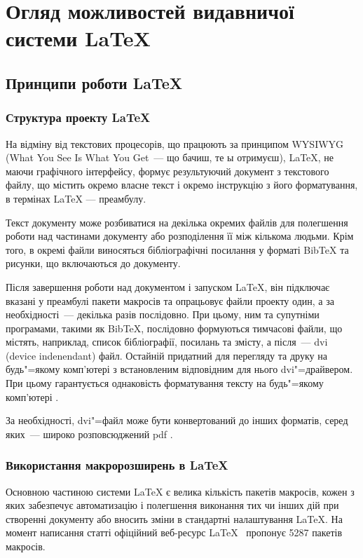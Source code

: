 \chapter{Огляд можливостей видавничої системи \LaTeX{} } 
\label{chapter:first}

\section{Принципи роботи \LaTeX{}}

\subsection{Структура проекту \LaTeX{}}

На відміну від текстових процесорів, що працюють за принципом {WYSIWYG} (What You See Is What You Get~--- що бачиш, те ы отримуєш), \LaTeX{}, не маючи графічного інтерфейсу, формує результуючий документ з текстового файлу, що містить окремо власне текст і окремо інструкцію з його форматування, в термінах \LaTeX{} --- преамбулу.

Текст документу може розбиватися на декілька окремих файлів для полегшення роботи над частинами документу або розподілення її між кількома людьми. Крім того, в окремі файли виносяться бібліографічні посилання у форматі BibTeX та рисунки, що включаються до документу. 

Після завершення роботи над документом і запуском \LaTeX{}, він підключає вказані у преамбулі пакети макросів та опрацьовує файли проекту один, а за необхідності~--- декілька разів послідовно. При цьому, ним та супутніми програмами, такими як BibTeX, послідовно формуються тимчасові файли, що містять, наприклад, список бібліографії, посилань та змісту, а після~--- dvi (device indenendant) файл. Остайній придатний для перегляду та друку на будь"=якому комп'ютері з встановленим відповідним для нього dvi"=драйвером. При цьому гарантується однаковість форматування тексту на будь"=якому комп'ютері \cite[с.~16]{Lvovskii2010NaborVerstka}.

За необхідності, dvi"=файл може бути конвертований до інших форматів, серед яких~--- широко розповсюджений pdf \cite{Habr2012BacDiplom}\cite{Habr2012TempDisser}.

\subsection{Використання макророзширень в \LaTeX{}}

Основною частиною системи LaTeX є велика кількість пакетів макросів, кожен з яких забезпечує автоматизацію і полегшення виконання тих чи інших дій при створенні документу або вносить зміни в стандартні налаштування \LaTeX{}. На момент написання статті офіційний веб-ресурс LaTeX~\cite{www:ctan} пропонує 5287 пакетів макросів. 

